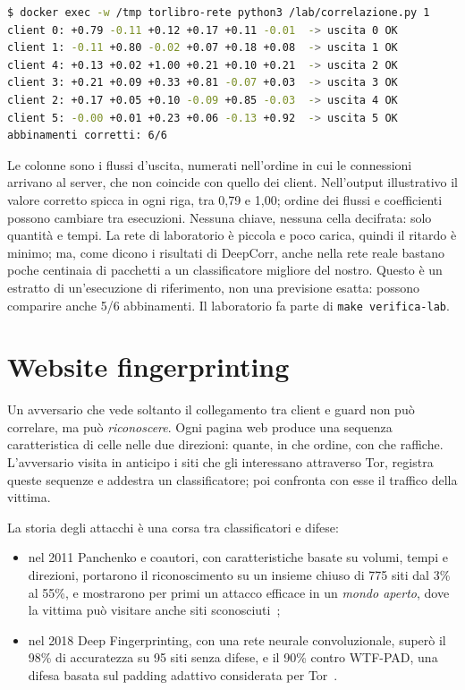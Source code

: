 \begin{lstlisting}[language=bash,numbers=none]
$ docker exec -w /tmp torlibro-rete python3 /lab/correlazione.py 1
client 0: +0.79 -0.11 +0.12 +0.17 +0.11 -0.01  -> uscita 0 OK
client 1: -0.11 +0.80 -0.02 +0.07 +0.18 +0.08  -> uscita 1 OK
client 4: +0.13 +0.02 +1.00 +0.21 +0.10 +0.21  -> uscita 2 OK
client 3: +0.21 +0.09 +0.33 +0.81 -0.07 +0.03  -> uscita 3 OK
client 2: +0.17 +0.05 +0.10 -0.09 +0.85 -0.03  -> uscita 4 OK
client 5: -0.00 +0.01 +0.23 +0.06 -0.13 +0.92  -> uscita 5 OK
abbinamenti corretti: 6/6
\end{lstlisting}
Le colonne sono i flussi d'uscita, numerati nell'ordine in cui le connessioni arrivano al server, che non coincide con quello dei client. Nell'output illustrativo il valore corretto spicca in ogni riga, tra 0,79 e 1,00; ordine dei flussi e coefficienti possono cambiare tra esecuzioni. Nessuna chiave, nessuna cella decifrata: solo quantità e tempi. La rete di laboratorio è piccola e poco carica, quindi il ritardo è minimo; ma, come dicono i risultati di DeepCorr, anche nella rete reale bastano poche centinaia di pacchetti a un classificatore migliore del nostro. Questo è un estratto di un'esecuzione di riferimento, non una previsione esatta: possono comparire anche 5/6 abbinamenti. Il laboratorio fa parte di \texttt{make verifica-lab}.

\section{Website fingerprinting}\label{sec:att-wf}

Un avversario che vede soltanto il collegamento tra client e guard non può correlare, ma può \emph{riconoscere}. Ogni pagina web produce una sequenza caratteristica di celle nelle due direzioni: quante, in che ordine, con che raffiche. L'avversario visita in anticipo i siti che gli interessano attraverso Tor, registra queste sequenze e addestra un classificatore; poi confronta con esse il traffico della vittima.

La storia degli attacchi è una corsa tra classificatori e difese:
\begin{itemize}
  \item nel 2011 Panchenko e coautori, con caratteristiche basate su volumi, tempi e direzioni, portarono il riconoscimento su un insieme chiuso di 775 siti dal 3\% al 55\%, e mostrarono per primi un attacco efficace in un \emph{mondo aperto}, dove la vittima può visitare anche siti sconosciuti~\cite{panchenko2011website};
  \item nel 2018 Deep Fingerprinting, con una rete neurale convoluzionale, superò il 98\% di accuratezza su 95 siti senza difese, e il 90\% contro WTF-PAD, una difesa basata sul padding adattivo considerata per Tor~\cite{sirinam2018deep}.
\end{itemize}

